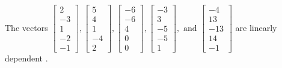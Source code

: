 \begin{exercise}
\begin{exerciseStatement}
  \end{exerciseStatement}
  \begin{exerciseAnswer}
   The vectors \(\left[\begin{array}{r}
2 \\
-3 \\
1 \\
-2 \\
-1
\end{array}\right] , \left[\begin{array}{r}
5 \\
4 \\
1 \\
-4 \\
2
\end{array}\right] , \left[\begin{array}{r}
-6 \\
-6 \\
4 \\
0 \\
0
\end{array}\right] , \left[\begin{array}{r}
-3 \\
3 \\
-5 \\
-5 \\
1
\end{array}\right] , \text{ and } \left[\begin{array}{r}
-4 \\
13 \\
-13 \\
14 \\
-1
\end{array}\right]\) are 
  	 linearly dependent  .
  


  \end{exerciseAnswer}
\end{exercise}